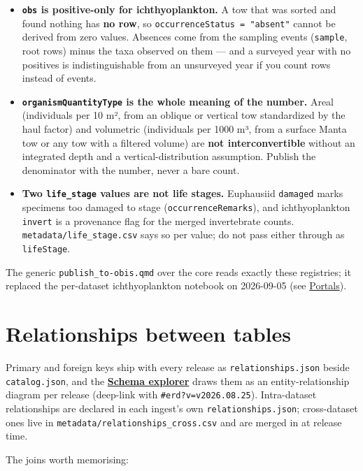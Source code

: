 \documentclass[
  letterpaper,
  DIV=11,
  numbers=noendperiod]{scrreprt}
\providecommand{\tightlist}{%
  \setlength{\itemsep}{0pt}\setlength{\parskip}{0pt}}
\begin{document}
\begin{itemize}
\tightlist
\item
  \textbf{\texttt{obs} is positive-only for ichthyoplankton.} A tow that
  was sorted and found nothing has \textbf{no row}, so
  \texttt{occurrenceStatus\ =\ "absent"} cannot be derived from zero
  values. Absences come from the sampling events (\texttt{sample}, root
  rows) minus the taxa observed on them --- and a surveyed year with no
  positives is indistinguishable from an unsurveyed year if you count
  rows instead of events.
\item
  \textbf{\texttt{organismQuantityType} is the whole meaning of the
  number.} Areal (individuals per 10 m², from an oblique or vertical tow
  standardized by the haul factor) and volumetric (individuals per 1000
  m³, from a surface Manta tow or any tow with a filtered volume) are
  \textbf{not interconvertible} without an integrated depth and a
  vertical-distribution assumption. Publish the denominator with the
  number, never a bare count.
\item
  \textbf{Two \texttt{life\_stage} values are not life stages.}
  Euphausiid \texttt{damaged} marks specimens too damaged to stage
  (\texttt{occurrenceRemarks}), and ichthyoplankton \texttt{invert} is a
  provenance flag for the merged invertebrate counts.
  \texttt{metadata/life\_stage.csv} says so per value; do not pass
  either through as \texttt{lifeStage}.
\end{itemize}

The generic \texttt{publish\_to-obis.qmd} over the core reads exactly
these registries; it replaced the per-dataset ichthyoplankton notebook
on 2026-09-05 (see \hyperref[obis]{Portals}).

\section{Relationships between
tables}\label{relationships-between-tables}

Primary and foreign keys ship with every release as
\texttt{relationships.json} beside \texttt{catalog.json}, and the
\href{https://calcofi.io/db-schema/}{\textbf{Schema explorer}} draws
them as an entity-relationship diagram per release (deep-link with
\texttt{\#erd?v=v2026.08.25}). Intra-dataset relationships are declared
in each ingest's own \texttt{relationships.json}; cross-dataset ones
live in \texttt{metadata/relationships\_cross.csv} and are merged in at
release time.

The joins worth memorising:
\end{document}
